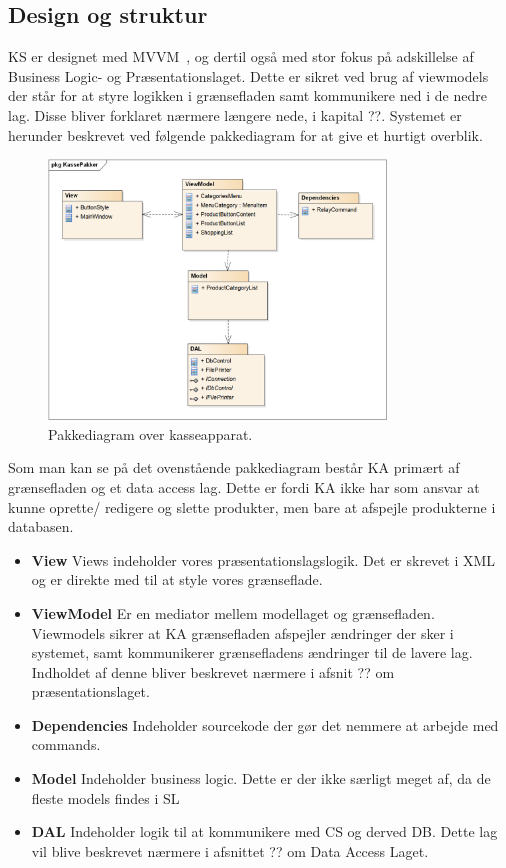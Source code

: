 \subsection{Design og struktur}
\gls{KS} er designet med MVVM~\cite{MVVM}, og dertil også med stor fokus på adskillelse af Business Logic- og Præsentationslaget. Dette er sikret ved brug af viewmodels der står for at styre logikken i grænsefladen samt kommunikere ned i de nedre lag. Disse bliver forklaret nærmere længere nede, i kapital ??.
Systemet er herunder beskrevet ved følgende pakkediagram for at give et hurtigt overblik.	

\begin{figure}[H]
	\centering
	\includegraphics[width=0.8\textwidth]{Systemdesign/Frontend/pics/KassePakker}
	\caption{Pakkediagram over kasseapparat.}
	\label{fig:EndeligeGUI}
\end{figure}

Som man kan se på det ovenstående pakkediagram består \gls{KA} primært af grænsefladen og et data access lag. Dette er fordi \gls{KA} ikke har som ansvar at kunne oprette/ redigere og slette produkter, men bare at afspejle produkterne i databasen. 

\begin{itemize}
	\item \textbf{View} Views indeholder vores præsentationslagslogik. Det er skrevet i XML og er direkte med til at style vores grænseflade.
	\item \textbf{ViewModel} Er en mediator mellem modellaget og grænsefladen. Viewmodels sikrer at \gls{KA} grænsefladen afspejler ændringer der sker i systemet, samt kommunikerer grænsefladens ændringer til de lavere lag. Indholdet af denne bliver beskrevet nærmere i afsnit ?? om præsentationslaget.
	\item \textbf{Dependencies} Indeholder sourcekode der gør det nemmere at arbejde med commands.
	\item \textbf{Model} Indeholder business logic. Dette er der ikke særligt meget af, da de fleste models findes i \gls{SL}
	\item \textbf{DAL} Indeholder logik til at kommunikere med \gls{CS} og derved \gls{DB}. Dette lag vil blive beskrevet nærmere i afsnittet ?? om Data Access Laget.
\end{itemize}



